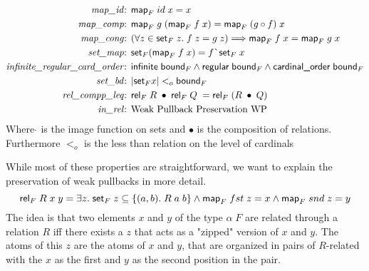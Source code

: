     \begin{align}
      \text{\textit{map\_id}: }& \text{\textsf{map}}_F\; id\; x = x\\
      \text{\textit{map\_comp}: }& \text{\textsf{map}}_F\; g\; (\text{\textsf{map}}_F\; f\; x) = \text{\textsf{map}}_F\; (g \circ f)\; x\\
      \text{\textit{map\_cong}: }& (\forall z \in \text{\textsf{set}}_F\; z.\; f\; z = g\; z) \Longrightarrow 
        \text{\textsf{map}}_F\; f\; x = \text{\textsf{map}}_F\; g\; x\\
      \text{\textit{set\_map}: }& \text{\textsf{set}}_F (\text{\textsf{map}}_F\; f\; x) = f\; \grave{}\; \text{\textsf{set}}_F\; x\\
      \text{\textit{infinite\_regular\_card\_order}: }& \text{\textsf{infinite}}\; \text{\textsf{bound}}_F \land 
        \text{\textsf{regular}}\; \text{\textsf{bound}}_F \land 
        \text{\textsf{cardinal\_order}}\; \text{\textsf{bound}}_F\\
      \text{\textit{set\_bd}: }& | \text{\textsf{set}}_F x | <_o \text{\textsf{bound}}_F\\
      \text{\textit{rel\_compp\_leq}: }& \text{\textsf{rel}}_F\; R\; \bullet\; \text{\textsf{rel}}_F\; Q\; = 
        \text{\textsf{rel}}_F\; (R\; \bullet\; Q)\\
      \text{\textit{in\_rel}: }& \text{Weak Pullback Preservation WP}
    \end{align}
    Where $\grave{}$ is the image function on sets and $\bullet$ is the composition of relations. Furthermore $<_o$ is the less than relation on the level of cardinals

    While most of these properties are straightforward, we want to explain the preservation of weak pullbacks in more detail.
    \begin{equation}
      \text{\textsf{rel}}_F\; R\; x\; y = \exists z.\; \text{\textsf{set}}_F\; z \subseteq \{(a, b).\; R\; a\; b \} \land 
        \text{\textsf{map}}_F\; fst\; z = x \land \text{\textsf{map}}_F\; snd\; z = y \label{eq:WP}
    \end{equation}
    The idea is that two elements $x$ and $y$ of the type $\alpha\; F$ are related through a relation $R$ iff there exists a $z$ that acts as a "zipped" version of $x$ and $y$. The atoms of this $z$ are the atoms of $x$ and $y$, that are organized in pairs of $R$-related with the $x$ as the first and $y$ as the second position in the pair.

